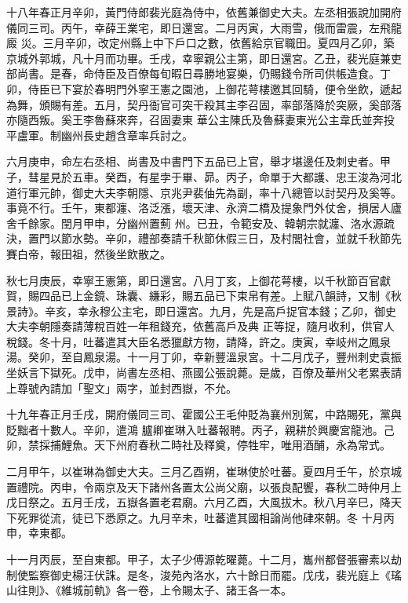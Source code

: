 \begin{pinyinscope}
 十八年春正月辛卯，黃門侍郎裴光庭為侍中，依舊兼御史大夫。左丞相張說加開府儀同三司。丙午，幸薛王業宅，即日還宮。二月丙寅，大雨雪，俄而雷震，左飛龍廄
 災。三月辛卯，改定州縣上中下戶口之數，依舊給京官職田。夏四月乙卯，築京城外郭城，凡十月而功畢。壬戌，幸寧親公主第，即日還宮。乙丑，裴光庭兼吏部尚書。是春，命侍臣及百僚每旬暇日尋勝地宴樂，仍賜錢令所司供帳造食。丁卯，侍臣已下宴於春明門外寧王憲之園池，上御花萼樓邀其回騎，便令坐飲，遞起為舞，頒賜有差。五月，契丹衙官可突干殺其主李召固，率部落降於突厥，奚部落亦隨西叛。奚王李魯蘇來奔，召固妻東
 華公主陳氏及魯蘇妻東光公主韋氏並奔投平盧軍。制幽州長史趙含章率兵討之。



 六月庚申，命左右丞相、尚書及中書門下五品已上官，舉才堪邊任及刺史者。甲子，彗星見於五車。癸酉，有星孛于畢、昴。丙子，命單于大都護、忠王浚為河北道行軍元帥，御史大夫李朝隱、京兆尹裴伷先為副，率十八總管以討契丹及奚等。事竟不行。壬午，東都瀍、洛泛漲，壞天津、永濟二橋及提象門外仗舍，損居人廬舍千餘家。閏月甲申，分幽州置薊
 州。已丑，令範安及、韓朝宗就瀍、洛水源疏決，置門以節水勢。辛卯，禮部奏請千秋節休假三日，及村閭社會，並就千秋節先賽白帝，報田祖，然後坐飲散之。



 秋七月庚辰，幸寧王憲第，即日還宮。八月丁亥，上御花萼樓，以千秋節百官獻賀，賜四品已上金鏡、珠囊、縑彩，賜五品已下束帛有差。上賦八韻詩，又制《秋景詩》。辛亥，幸永穆公主宅，即日還宮。九月，先是高戶捉官本錢；乙卯，御史大夫李朝隱奏請薄稅百姓一年租錢充，依舊高戶及典
 正等捉，隨月收利，供官人稅錢。冬十月，吐蕃遣其大臣名悉獵獻方物，請降，許之。庚寅，幸岐州之鳳泉湯。癸卯，至自鳳泉湯。十一月丁卯，幸新豐溫泉宮。十二月戊子，豐州刺史袁振坐妖言下獄死。戊申，尚書左丞相、燕國公張說薨。是歲，百僚及華州父老累表請上尊號內請加「聖文」兩字，並封西嶽，不允。



 十九年春正月壬戌，開府儀同三司、霍國公王毛仲貶為襄州別駕，中路賜死，黨與貶黜者十數人。辛卯，遣鴻
 臚卿崔琳入吐蕃報聘。丙子，親耕於興慶宮龍池。己卯，禁採捕鯉魚。天下州府春秋二時社及釋奠，停牲牢，唯用酒酺，永為常式。



 二月甲午，以崔琳為御史大夫。三月乙酉朔，崔琳使於吐蕃。夏四月壬午，於京城置禮院。丙申，令兩京及天下諸州各置太公尚父廟，以張良配饗，春秋二時仲月上戊日祭之。五月壬戌，五嶽各置老君廟。六月乙酉，大風拔木。秋八月辛巳，降天下死罪從流，徒已下悉原之。九月辛未，吐蕃遣其國相論尚他硉來朝。冬
 十月丙申，幸東都。



 十一月丙辰，至自東都。甲子，太子少傅源乾曜薨。十二月，巂州都督張審素以劫制使監察御史楊汪伏誅。是冬，浚苑內洛水，六十餘日而罷。戊戌，裴光庭上《瑤山往則》、《維城前軌》各一卷，上令賜太子、諸王各一本。




\end{pinyinscope}
